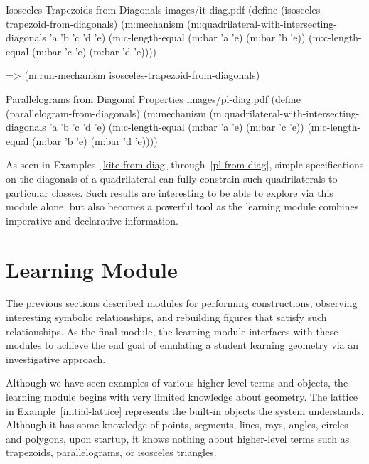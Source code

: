 \begin{pdf-example}
[label=it-from-diag,
comment style={frame hidden,
opacityback=0,
height=5.6cm,
raster columns=2,graphics pages={1,2}}]
{Isosceles Trapezoids from Diagonals}
{images/it-diag.pdf}
(define (isosceles-trapezoid-from-diagonals)
  (m:mechanism
   (m:quadrilateral-with-intersecting-diagonals 'a 'b 'c 'd 'e)
   (m:c-length-equal (m:bar 'a 'e) (m:bar 'b 'e))
   (m:c-length-equal (m:bar 'c 'e) (m:bar 'd 'e))))

=> (m:run-mechanism isosceles-trapezoid-from-diagonals)
\end{pdf-example}

\begin{pdf-example}
[label=pl-from-diag,
comment style={frame hidden,
opacityback=0,
height=5.6cm,
raster columns=2,graphics pages={1,2}}]
{Parallelograms from Diagonal Properties}
{images/pl-diag.pdf}
(define (parallelogram-from-diagonals)
  (m:mechanism
   (m:quadrilateral-with-intersecting-diagonals 'a 'b 'c 'd 'e)
   (m:c-length-equal (m:bar 'a 'e) (m:bar 'c 'e))
   (m:c-length-equal (m:bar 'b 'e) (m:bar 'd 'e))))
\end{pdf-example}

As seen in Examples~\ref{kite-from-diag} through~\ref{pl-from-diag},
simple specifications on the diagonals of a quadrilateral can fully
constrain such quadrilaterals to particular classes.  Such results
are interesting to be able to explore via this module alone, but also
becomes a powerful tool as the learning module combines imperative and
declarative information.

\enlargethispage*{\baselineskip}

\section{Learning Module}
\label{sec:end-goal-1}

The previous sections described modules for performing constructions,
observing interesting symbolic relationships, and rebuilding figures
that satisfy such relationships. As the final module, the learning
module interfaces with these modules to achieve the end goal of
emulating a student learning geometry via an investigative approach.

Although we have seen examples of various higher-level terms and
objects, the learning module begins with very limited knowledge about
geometry. The lattice in Example~\ref{initial-lattice} represents the
built-in objects the system understands. Although it has some
knowledge of points, segments, lines, rays, angles, circles and
polygons, upon startup, it knows nothing about higher-level terms such
as trapezoids, parallelograms, or isosceles triangles.

